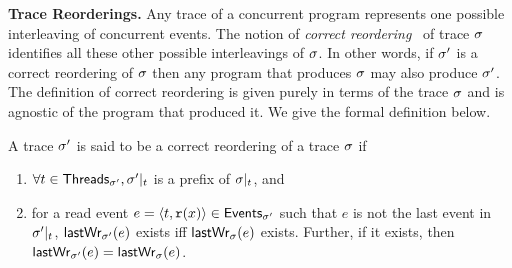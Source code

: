 \vspace*{0.1in}
\noindent
{\bf Trace Reorderings.} Any trace of a concurrent program represents
one possible interleaving of concurrent events. The notion
of \emph{correct reordering}~\cite{cp2012,wcp2017} of trace $\sigma$ identifies
all these other possible interleavings of $\sigma$. In other words, if
$\sigma'$ is a correct reordering of $\sigma$ then any program that produces
$\sigma$ may also produce $\sigma'$. The definition of correct reordering is
given purely in terms of the trace $\sigma$ and is agnostic of the
program that produced it. We give the formal definition below.
%
\begin{definition}
\label{def:correct-reorder}
A trace $\sigma'$ is said to be a correct reordering of
a trace $\sigma$ if
\begin{enumerate}[label=(\alph*)]
\item $\forall t \in \mathsf{Threads}_{\sigma'}, \sigma'|_{t}$ is a prefix of 
  $\sigma|_{t}$, and
\item for a read event $e = \langle t, \mathtt{r}(x)\rangle \in \mathsf{Events}_{\sigma'}$
such that $e$ is not the last event in $\sigma'|_{t}$,
$\mathsf{lastWr}_{\sigma'}(e)$ exists iff $\mathsf{lastWr}_{\sigma}(e)$ exists.  Further, if it
exists, then $\mathsf{lastWr}_{\sigma'}(e) = \mathsf{lastWr}_{\sigma}(e)$.
\end{enumerate}
\end{definition}
